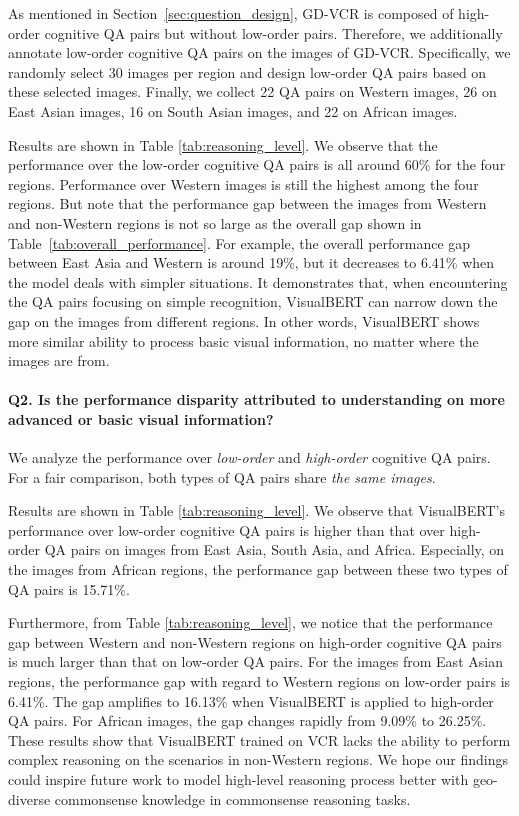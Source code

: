 \documentclass[11pt]{article}
\begin{document}
As mentioned in Section~\ref{sec:question_design}, GD-VCR is composed of high-order cognitive QA pairs but without low-order pairs. Therefore, we additionally annotate low-order cognitive QA pairs on the images of GD-VCR. Specifically, we randomly select 30 images per region and design low-order QA pairs based on these selected images. Finally, we collect 22 QA pairs on Western images, 26 on East Asian images, 16 on South Asian images, and 22 on African images.

Results are shown in Table \ref{tab:reasoning_level}. We observe that the performance over the low-order cognitive QA pairs is all around 60\% for the four regions. Performance over Western images is still the highest among the four regions. But note that the performance gap between the images from Western and non-Western regions is not so large as the overall gap shown in Table~\ref{tab:overall_performance}. For example, the overall performance gap between East Asia and Western is around 19\%, but it decreases to 6.41\% when the model deals with simpler situations. It demonstrates that, when encountering the QA pairs focusing on simple recognition, VisualBERT can narrow down the gap on the images from different regions. In other words, VisualBERT shows more similar ability to process basic visual information, no matter where the images are from.

\paragraph{Q2. Is the performance disparity attributed to understanding on more advanced or basic visual information?}
We analyze the performance over \emph{low-order} and \emph{high-order} cognitive QA pairs. For a fair comparison, both types of QA pairs share \emph{the same images}.

Results are shown in Table \ref{tab:reasoning_level}. We observe that VisualBERT's performance over low-order cognitive QA pairs is higher than that over high-order QA pairs on images from East Asia, South Asia, and Africa. Especially, on the images from African regions, the performance gap between these two types of QA pairs is 15.71\%. 

Furthermore, from Table \ref{tab:reasoning_level}, we notice that the performance gap between Western and non-Western regions on high-order cognitive QA pairs is much larger than that on low-order QA pairs. For the images from East Asian regions, the performance gap with regard to Western regions on low-order pairs is 6.41\%. The gap amplifies to 16.13\% when VisualBERT is applied to high-order QA pairs. For African images, the gap changes rapidly from 9.09\% to 26.25\%. These results show that VisualBERT trained on VCR lacks the ability to perform complex reasoning on the scenarios in non-Western regions. We hope our findings could inspire future work to model high-level reasoning process better with geo-diverse commonsense knowledge in commonsense reasoning tasks.
\end{document}
